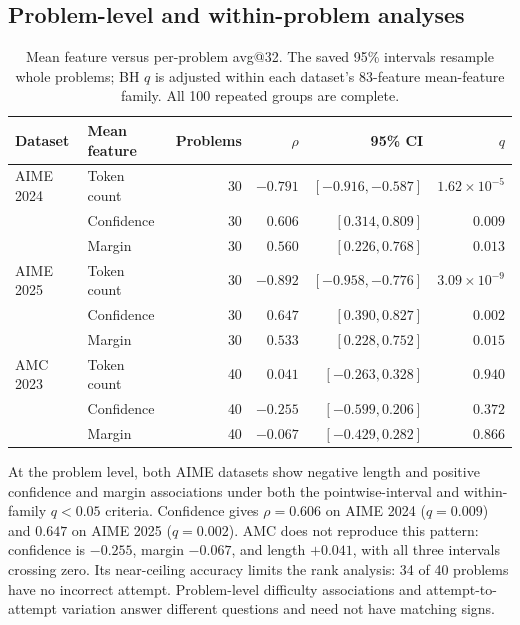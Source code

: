 \subsection{Problem-level and within-problem analyses}

\begin{table}[t]
\centering
\small
\caption{Mean feature versus per-problem avg@32. The saved 95\% intervals resample whole problems; BH $q$ is adjusted within each dataset's 83-feature mean-feature family. All 100 repeated groups are complete. }
\label{tab:qwen-corr-problem}
\begin{tabular}{@{}llrrrr@{}}
\toprule
Dataset & Mean feature & Problems & $\rho$ & 95\% CI & $q$ \\
\midrule
AIME 2024 & Token count & 30 & $-0.791$ & $[-0.916,-0.587]$ & $1.62\times10^{-5}$ \\
 & Confidence & 30 & $0.606$ & $[0.314,0.809]$ & $0.009$ \\
 & Margin & 30 & $0.560$ & $[0.226,0.768]$ & $0.013$ \\
AIME 2025 & Token count & 30 & $-0.892$ & $[-0.958,-0.776]$ & $3.09\times10^{-9}$ \\
 & Confidence & 30 & $0.647$ & $[0.390,0.827]$ & $0.002$ \\
 & Margin & 30 & $0.533$ & $[0.228,0.752]$ & $0.015$ \\
AMC 2023 & Token count & 40 & $0.041$ & $[-0.263,0.328]$ & $0.940$ \\
 & Confidence & 40 & $-0.255$ & $[-0.599,0.206]$ & $0.372$ \\
 & Margin & 40 & $-0.067$ & $[-0.429,0.282]$ & $0.866$ \\
\bottomrule
\end{tabular}
\end{table}

At the problem level, both AIME datasets show negative length and positive
confidence and margin associations under both the pointwise-interval and
within-family $q<0.05$ criteria. Confidence gives $\rho=0.606$ on AIME 2024
($q=0.009$) and $0.647$ on AIME 2025 ($q=0.002$). AMC does not reproduce this
pattern: confidence is $-0.255$, margin $-0.067$, and length $+0.041$, with all
three intervals crossing zero. Its near-ceiling accuracy limits the rank
analysis: 34 of 40 problems have no incorrect attempt. Problem-level
difficulty associations and attempt-to-attempt variation answer different
questions and need not have matching signs.

